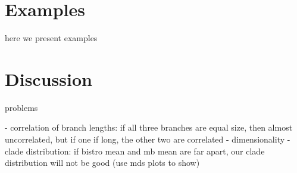 \documentclass[conference]{IEEEtran}
\begin{document}
\section{Examples}
\label{examples}
here we present examples

\section{Discussion}
\label{discussion}
problems

- correlation of branch lengths: if all three branches are equal size,
then almost uncorrelated, but if one if long, the other two are correlated
- dimensionality
- clade distribution: if bistro mean and mb mean are far apart, our
clade distribution will not be good (use mds plots to show)


\end{document}
